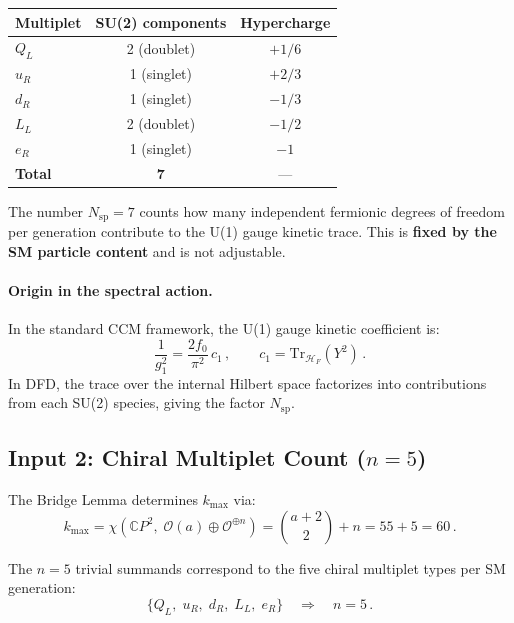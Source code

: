 \documentclass[12pt,a4paper]{article}
\theoremstyle{definition}
\begin{document}
\begin{center}
\renewcommand{\arraystretch}{1.2}
\begin{tabular}{lcc}
\toprule
Multiplet & SU(2) components & Hypercharge \\
\midrule
$Q_L$ & 2 (doublet) & $+1/6$ \\
$u_R$ & 1 (singlet) & $+2/3$ \\
$d_R$ & 1 (singlet) & $-1/3$ \\
$L_L$ & 2 (doublet) & $-1/2$ \\
$e_R$ & 1 (singlet) & $-1$ \\
\midrule
\textbf{Total} & \textbf{7} & --- \\
\bottomrule
\end{tabular}
\end{center}

The number $N_{\mathrm{sp}} = 7$ counts how many independent fermionic
degrees of freedom per generation contribute to the U(1) gauge kinetic
trace.  This is \textbf{fixed by the SM particle content} and is not
adjustable.

\paragraph{Origin in the spectral action.}
In the standard CCM framework, the U(1) gauge kinetic coefficient is:
\begin{equation}\label{eq:ccm-coupling}
\frac{1}{g_1^2} = \frac{2f_0}{\pi^2}\,c_1\,,
\qquad c_1 = \mathrm{Tr}_{\mathcal{H}_F}(Y^2)\,.
\end{equation}
In DFD, the trace over the internal Hilbert space factorizes into
contributions from each SU(2) species, giving the factor $N_{\mathrm{sp}}$.

\subsection{Input 2: Chiral Multiplet Count ($n = 5$)}
\label{sec:n}

The Bridge Lemma determines $k_{\max}$ via:
\begin{equation}
k_{\max} = \chi(\mathbb{C}P^2,\; \mathcal{O}(a) \oplus \mathcal{O}^{\oplus n})
= \binom{a+2}{2} + n = 55 + 5 = 60\,.
\end{equation}

The $n = 5$ trivial summands correspond to the five chiral multiplet
types per SM generation:
\begin{equation}
\{Q_L,\; u_R,\; d_R,\; L_L,\; e_R\} \quad\Longrightarrow\quad n = 5\,.
\end{equation}
\end{document}
